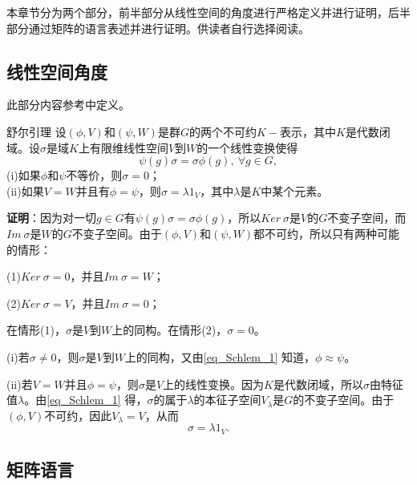 
\begin{issues}
\issueDraft
\issueNeedCite
\issueTODO
\issueMissDepend
\end{issues}


本章节分为两个部分，前半部分从线性空间的角度进行严格定义并进行证明，后半部分通过矩阵的语言表述并进行证明。供读者自行选择阅读。

\subsection{线性空间角度}

此部分内容参考\cite{维声表示}中定义。

\begin{lemma}{舒尔引理}
设$(\phi,V)$和$(\psi,W)$是群$G$的两个不可约$K-$表示，其中$K$是代数闭域。设$\sigma$是域$K$上有限维线性空间$V$到$W$的一个线性变换使得
\begin{equation}\label{eq_Schlem_1}
\psi(g)\sigma =\sigma \phi(g),~\forall g \in G,
\end{equation}
(i)如果$\phi$和$\psi$不等价，则$\sigma=0$； \\
(ii)如果$V=W$并且有$\phi=\psi$，则$\sigma=\lambda1_V$，其中$\lambda$是$K$中某个元素。
\end{lemma}

\textbf{证明}：因为对一切$g\in G$有$\psi(g)\sigma =\sigma \phi(g)$，所以$Ker~\sigma $是$V$的$G$不变子空间，而$Im~\sigma$是$W$的$G$不变子空间。由于$(\phi,V)$和$(\psi,W)$都不可约，所以只有两种可能的情形：

(1)$Ker~\sigma =0$，并且$Im~\sigma=W$；

(2)$Ker~\sigma =V$，并且$Im~\sigma=0$；

在情形(1)，$\sigma $是$V$到$W$上的同构。在情形(2)，$\sigma=0$。

(i)若$\sigma \neq 0$，则$\sigma$是$V$到$W$上的同构，又由\autoref{eq_Schlem_1} 知道，$\phi \approx \psi$。

(ii)若$V=W$并且$\phi=\psi$，则$\sigma$是$V$上的线性变换。因为$K$是代数闭域，所以$\sigma$由特征值$\lambda$。由\autoref{eq_Schlem_1} 得，$\sigma$的属于$\lambda$的本征子空间$V_\lambda$是$G$的不变子空间。由于$(\phi,V)$不可约，因此$V_\lambda=V$，从而
\begin{equation}
\sigma=\lambda1_V.
\end{equation}

\subsection{矩阵语言}

